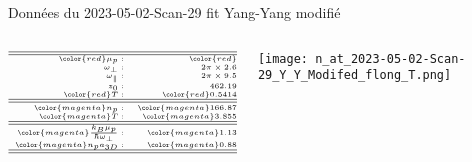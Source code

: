 \begin{frame}[shrink=1]{Données du 2023-05-02-Scan-29 fit Yang-Yang modifié }
{\begin{columns}
		\begin{column}{0.3\linewidth}
			$$ 
			{\tiny
			\begin{array}{rrl}
				\hline
				\hline
				{\color{red} \mu_p : }  & {\color{red}  } & {\color{red} \mu K }\\
				\omega_\perp :  & 2 \pi  \times  2.6 & kHz	\\
				 \omega_\parallel : & 2 \pi \times 9.5  &  Hz	\\
				z_0 :  & 462.19  & \mu m	\\
				{\color{red} T : } & {\color{red} 0.5414 } & {\color{red} \mu K}\\			
				\hline
				\hline
				{\color{magenta} n_p : }  &  {\color{magenta} 166.87 } & {\color{magenta} {\mu m}^{-1}}\\	
				{\color{magenta} T : } & {\color{magenta} 3.855  } & {\color{magenta}\mu_p} \\				
				\hline
				\hline	
				{\color{magenta} \frac{ k_B \mu_p}{\hbar \omega_\perp } : } & {\color{magenta} 1.13 } & 	\\
				{\color{magenta} n_p a_{3D} :}  &  {\color{magenta} 0.88}  &  \\
				\hline
				\hline	
			\end{array}
			}
			$$


		\end{column}
		
		\begin{column}{0.7\linewidth}
			\centering
			\texttt{[image: n\_at\_2023-05-02-Scan-29\_Y\_Y\_Modifed\_flong\_T.png]}	
		\end{column}


		
	\end{columns}
		
	}
		

	
\end{frame}



